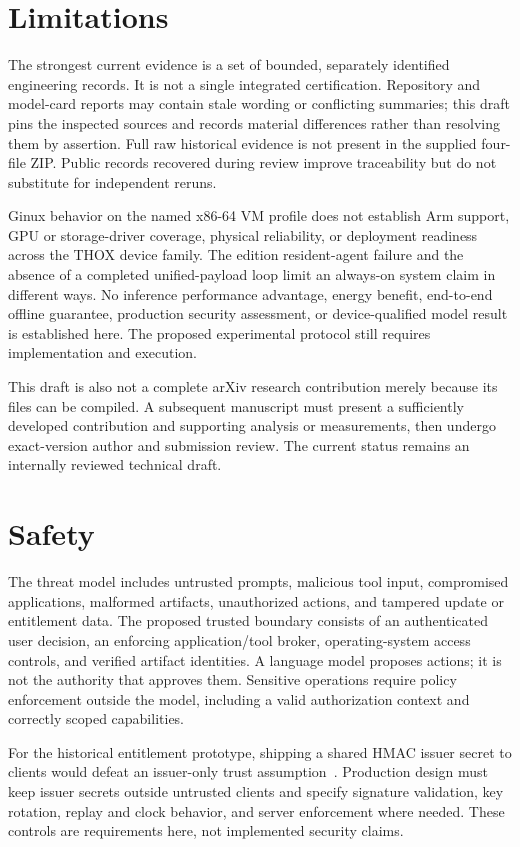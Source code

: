 \documentclass[11pt,a4paper]{article}
\begin{document}
\section{Limitations}
The strongest current evidence is a set of bounded, separately identified engineering records. It is not a single integrated certification. Repository and model-card reports may contain stale wording or conflicting summaries; this draft pins the inspected sources and records material differences rather than resolving them by assertion. Full raw historical evidence is not present in the supplied four-file ZIP. Public records recovered during review improve traceability but do not substitute for independent reruns.

Ginux behavior on the named x86-64 VM profile does not establish Arm support, GPU or storage-driver coverage, physical reliability, or deployment readiness across the THOX device family. The edition resident-agent failure and the absence of a completed unified-payload loop limit an always-on system claim in different ways. No inference performance advantage, energy benefit, end-to-end offline guarantee, production security assessment, or device-qualified model result is established here. The proposed experimental protocol still requires implementation and execution.

This draft is also not a complete arXiv research contribution merely because its files can be compiled. A subsequent manuscript must present a sufficiently developed contribution and supporting analysis or measurements, then undergo exact-version author and submission review. The current status remains an internally reviewed technical draft.

\section{Safety}
The threat model includes untrusted prompts, malicious tool input, compromised applications, malformed artifacts, unauthorized actions, and tampered update or entitlement data. The proposed trusted boundary consists of an authenticated user decision, an enforcing application/tool broker, operating-system access controls, and verified artifact identities. A language model proposes actions; it is not the authority that approves them. Sensitive operations require policy enforcement outside the model, including a valid authorization context and correctly scoped capabilities.

For the historical entitlement prototype, shipping a shared HMAC issuer secret to clients would defeat an issuer-only trust assumption~\cite{hmac}. Production design must keep issuer secrets outside untrusted clients and specify signature validation, key rotation, replay and clock behavior, and server enforcement where needed. These controls are requirements here, not implemented security claims.
\end{document}
